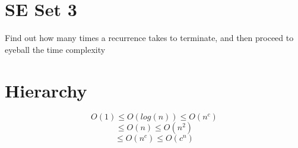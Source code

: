 \documentclass[fontsize=10pt,a4paper]{article}
\begin{document}
\begin{multicols}{3}
\begin{itemize}
    \end{itemize}


    \section{SE Set 3}
    Find out how many times a recurrence takes to terminate, and then proceed to eyeball the time complexity

    \section{Hierarchy}
    $$O(1) \leqslant O(log(n)) \leqslant O(n^c)$$
    $$\leqslant O(n) \leqslant O(n^2)$$
    $$\leqslant O(n^c) \leqslant O(c^n)$$









\end{multicols}
\end{document}
